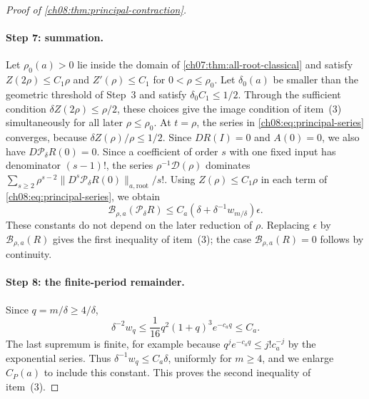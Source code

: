 \begin{proof}[Proof of \cref{ch08:thm:principal-contraction}]
\paragraph{Step 7: summation.}
Let $\rho_0(a)>0$ lie inside the domain of \cref{ch07:thm:all-root-classical} and satisfy $Z(2\rho)\le C_1\rho$ and $Z'(\rho)\le C_1$ for $0<\rho\le\rho_0$. Let $\delta_0(a)$ be smaller than the geometric threshold of Step~3 and satisfy $\delta_0C_1\le1/2$. Through the sufficient condition $\delta Z(2\rho)\le\rho/2$, these choices give the image condition of item~(3) simultaneously for all later $\rho\le\rho_0$. At $t=\rho$, the series in \eqref{ch08:eq:principal-series} converges, because $\delta Z(\rho)/\rho\le1/2$. Since $DR(I)=0$ and $A(0)=0$, we also have $D\mathcal P_\delta R(0)=0$. Since a coefficient of order $s$ with one fixed input has denominator $(s-1)!$, the series $\rho^{-1}\mathcal D(\rho)$ dominates $\sum_{s\ge2}\rho^{s-2}\|D^s\mathcal P_\delta R(0)\|_{a,\mathrm{root}}/s!$. Using $Z(\rho)\le C_1\rho$ in each term of \eqref{ch08:eq:principal-series}, we obtain
\[
 \mathcal B_{\rho,a}(\mathcal P_\delta R)
 \le C_a(\delta+\delta^{-1}w_{m/\delta})\epsilon.
\]
These constants do not depend on the later reduction of $\rho$. Replacing $\epsilon$ by $\mathcal B_{\rho,a}(R)$ gives the first inequality of item~(3); the case $\mathcal B_{\rho,a}(R)=0$ follows by continuity.

\paragraph{Step 8: the finite-period remainder.}
Since $q=m/\delta\ge4/\delta$,
\[
 \delta^{-2}w_q
 \le\frac1{16}q^2(1+q)^3e^{-c_aq}\le C_a.
\]
The last supremum is finite, for example because $q^je^{-c_aq}\le j!c_a^{-j}$ by the exponential series. Thus $\delta^{-1}w_q\le C_a\delta$, uniformly for $m\ge4$, and we enlarge $C_P(a)$ to include this constant. This proves the second inequality of item~(3).


\end{proof}
